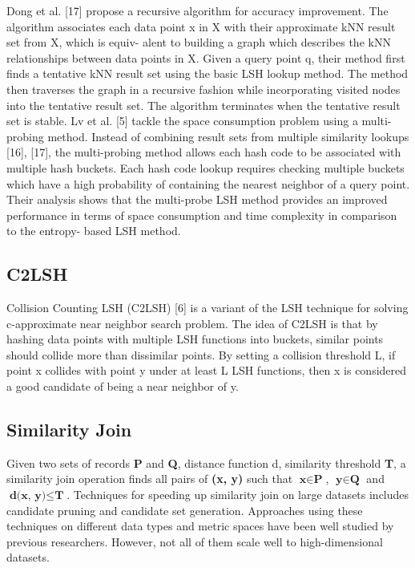 \documentclass{vldb}
\begin{document}
Dong et al. [17] propose a recursive algorithm for accuracy improvement. The algorithm associates each data point x in X with their approximate kNN result set from X, which is equiv- alent to building a graph which describes the kNN relationships between data points in X. Given a query point q, their method first finds a tentative kNN result set using the basic LSH lookup method. The method then traverses the graph in a recursive fashion while incorporating visited nodes into the tentative result set. The algorithm terminates when the tentative result set is stable.
Lv et al. [5] tackle the space consumption problem using a multi-probing method. Instead of combining result sets from multiple similarity lookups [16], [17], the multi-probing method allows each hash code to be associated with multiple hash buckets. Each hash code lookup requires checking multiple buckets which have a high probability of containing the nearest neighbor of a query point. Their analysis shows that the multi-probe LSH method provides an improved performance in terms of space consumption and time complexity in comparison to the entropy- based LSH method.

\subsection{C2LSH}
Collision Counting LSH (C2LSH) [6] is a variant of the LSH technique for solving c-approximate near neighbor search problem. The idea of C2LSH is that by hashing data points with multiple LSH functions into buckets, similar points should collide more than dissimilar points. By setting a collision threshold L, if point x collides with point y under at least L LSH functions, then x is considered a good candidate of being a near neighbor of y.

\subsection{Similarity Join}
Given two sets of records \textbf{P} and \textbf{Q}, distance function d, similarity threshold \textbf{T}, a similarity join operation finds all pairs of \textbf{(x, y)} such that $\textbf{x} \in \textbf{P}$, $\textbf{y} \in \textbf{Q}$ and $\textbf{d(x, y)} \leq \textbf{T}$.
Techniques for speeding up similarity join on large datasets includes candidate pruning and candidate set generation. Approaches using these techniques on different data types and metric spaces have been well studied by previous researchers. However, not all of them scale well to high-dimensional datasets.
\end{document}
